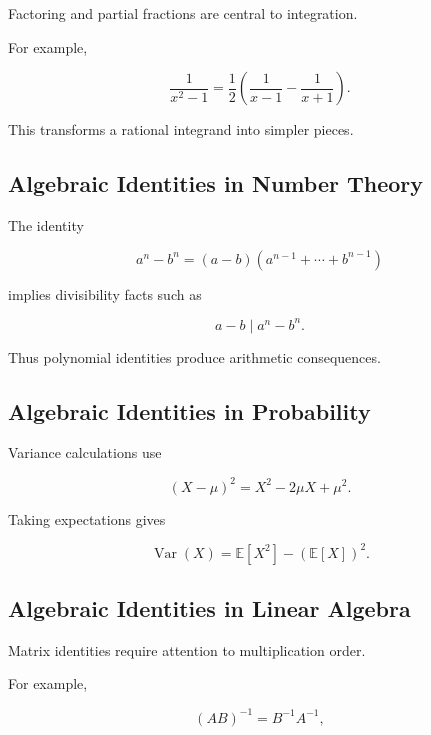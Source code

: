 Factoring and partial fractions are central to integration.

For example,

\[
\boxed{
\frac{1}{x^2-1}
=
\frac12
\left(
\frac1{x-1}
-
\frac1{x+1}
\right).
}
\]

This transforms a rational integrand into simpler pieces.

\subsection{Algebraic Identities in Number Theory}
\label{subsec:algebraic-identities-number-theory}

The identity

\[
\boxed{
a^n-b^n
=
(a-b)
\left(
a^{n-1}+\cdots+b^{n-1}
\right)
}
\]

implies divisibility facts such as

\[
\boxed{
a-b
\mid
a^n-b^n.
}
\]

Thus polynomial identities produce arithmetic consequences.

\subsection{Algebraic Identities in Probability}
\label{subsec:algebraic-identities-probability}

Variance calculations use

\[
\boxed{
(X-\mu)^2
=
X^2-2\mu X+\mu^2.
}
\]

Taking expectations gives

\[
\boxed{
\operatorname{Var}(X)
=
\mathbb{E}[X^2]
-
(\mathbb{E}[X])^2.
}
\]

\subsection{Algebraic Identities in Linear Algebra}
\label{subsec:algebraic-identities-linear-algebra}

Matrix identities require attention to multiplication order.

For example,

\[
\boxed{
(AB)^{-1}
=
B^{-1}A^{-1},
}
\]

